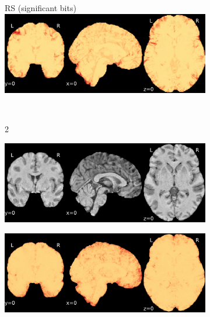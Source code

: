\documentclass{article}
\begin{document}
\begin{appendices}
\begin{landscape}
\begin{figure}
\begin{subfigure}[t]{0.2\paperheight}
            \end{subfigure}
            \begin{subfigure}[t]{0.2\paperheight}
                \centering
                RS (significant bits)
                \includegraphics[width=\textwidth]{figures/sig/0mm/rs_ds001600_sub-1_sig.pdf}
            \end{subfigure} \\
            \begin{subfigure}[b][][c]{0.01\paperwidth} 2 \vspace*{15pt} \end{subfigure}
            \begin{subfigure}[t]{0.2\paperheight}
                \centering
                \includegraphics[width=\textwidth]{figures/sig/0mm/ieee_ds001771_sub-36.pdf}
            \end{subfigure}
            \begin{subfigure}[t]{0.2\paperheight}
                \centering
                \includegraphics[width=\textwidth]{figures/sig/0mm/rr_ds001771_sub-36_sig.pdf}

\end{subfigure}
\end{figure}
\end{landscape}
\end{appendices}
\end{document}
